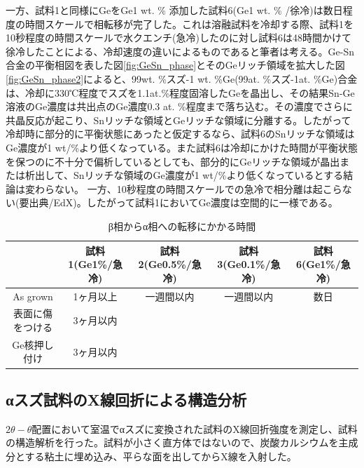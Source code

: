 一方、試料1と同様にGeをGe1 wt. \% 添加した試料6(Ge1 wt. \% /徐冷)は数日程度の時間スケールで相転移が完了した。これは溶融試料を冷却する際、試料1を10秒程度の時間スケールで水クエンチ(急冷)したのに対し試料6は48時間かけて徐冷したことによる、冷却速度の違いによるものであると筆者は考える。Ge-Sn合金の平衡相図を表した図\ref{fig:GeSn_phase}とそのGeリッチ領域を拡大した図\ref{fig:GeSn_phase2}によると、99wt. \%スズ-1 wt. \%Ge(99at. \%スズ-1at. \%Ge)合金は、冷却に330℃程度でスズを1.1at.\%程度固溶したGeを晶出し、その結果Sn-Ge溶液のGe濃度は共出点のGe濃度0.3 at. \%程度\cite{Thurmond1960}まで落ち込む。その濃度でさらに共晶反応が起こり、Snリッチな領域とGeリッチな領域に分離する。したがって冷却時に部分的に平衡状態にあったと仮定するなら、試料6のSnリッチな領域はGe濃度が1 wt/\%より低くなっている。また試料6は冷却にかけた時間が平衡状態を保つのに不十分で偏析しているとしても、部分的にGeリッチな領域が晶出または析出して、Snリッチな領域のGe濃度が1 wt/\%より低くなっているとする結論は変わらない。
一方、10秒程度の時間スケールでの急冷で相分離は起こらない(要出典/EdX)。したがって試料1においてGe濃度は空間的に一様である。
\begin{table}[htb]
    \begin{center}
  \begin{tabular}{c|cccc}
    & 試料1(Ge1\%/急冷) & 試料2(Ge0.5\%/急冷) & 試料3(Ge0.1\%/急冷)& 試料6(Ge1\%/急冷) \\ \hline
    As grown & 1ヶ月以上　& 一週間以内 & 一週間以内 & 数日 \\
    表面に傷をつける & 3ヶ月以内 & && \\
    Ge核押し付け& 3ヶ月以内　& & &  \\
  \end{tabular}
  \caption{β相からα相への転移にかかる時間}
  \label{tab:trans_Time}
    \end{center}
\end{table}

\subsection{αスズ試料のX線回折による構造分析}
$2\theta-\theta$配置において室温でαスズに変換された試料のX線回折強度を測定し、試料の構造解析を行った。試料が小さく直方体ではないので、炭酸カルシウムを主成分とする粘土に埋め込み、平らな面を出してからX線を入射した。

